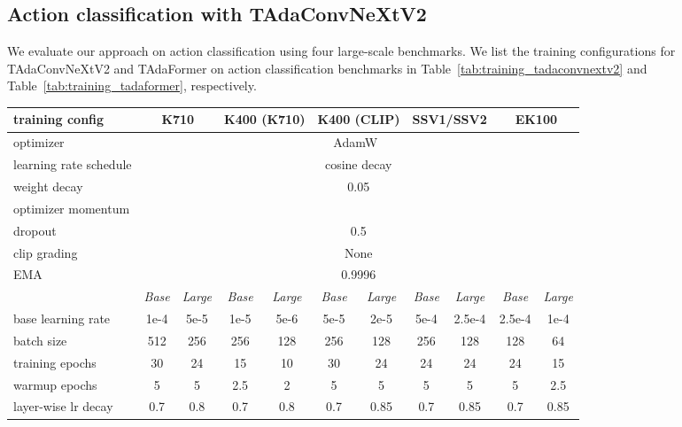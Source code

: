 \documentclass[10pt,journal,compsoc]{IEEEtran}
\newcommand{\tablestyle}[2]{\setlength{\tabcolsep}{#1}\renewcommand{\arraystretch}{#2}\centering\small}
\begin{document}
\subsection{Action classification with TAdaConvNeXtV2}
We evaluate our approach on action classification using four large-scale benchmarks. We list the training configurations for TAdaConvNeXtV2 and TAdaFormer on action classification benchmarks in Table~\ref{tab:training_tadaconvnextv2} and Table~\ref{tab:training_tadaformer}, respectively. 
\begin{table*}[t]
    \centering
    \tablestyle{10pt}{1.0}
    \begin{tabular}{l|cc|cc|cc|cc|cc}
        \toprule
         training config & \multicolumn{2}{c}{K710} & \multicolumn{2}{c}{K400 (K710)} & \multicolumn{2}{c}{K400 (CLIP)} & \multicolumn{2}{c}{SSV1/SSV2} & \multicolumn{2}{c}{EK100} \\
         \midrule
         optimizer& \multicolumn{10}{c}{AdamW~\cite{adamw}} \\
         learning rate schedule & \multicolumn{10}{c}{cosine decay} \\
         weight decay & \multicolumn{10}{c}{0.05} \\
         optimizer momentum & \multicolumn{10}{c}{} \\
         dropout~\cite{dropout} & \multicolumn{10}{c}{0.5} \\
         clip grading & \multicolumn{10}{c}{None} \\
         EMA~\cite{polyak1992ema} & \multicolumn{10}{c}{0.9996} \\
         \midrule
         ~ & \scriptsize\textit{Base} & \scriptsize\textit{Large} & \scriptsize\textit{Base} & \scriptsize\textit{Large} & \scriptsize\textit{Base} & \scriptsize\textit{Large} & \scriptsize\textit{Base} & \scriptsize\textit{Large} & \scriptsize\textit{Base} & \scriptsize\textit{Large}\\
         \cmidrule(lr){2-3} \cmidrule(lr){4-5} \cmidrule(lr){6-7} \cmidrule(lr){8-9} \cmidrule(lr){10-11}
         base learning rate & 1e-4 & 5e-5  & 1e-5  & 5e-6 & 5e-5 & 2e-5 & 5e-4 & 2.5e-4 & 2.5e-4 & 1e-4 \\
         batch size & 512  & 256  & 256  & 128 & 256 & 128 & 256 & 128 & 128 & 64\\
         training epochs & 30  & 24  & 15  & 10 & 30 & 24 & 24 & 24 & 24 & 15\\
         warmup epochs & 5 & 5 & 2.5  & 2 & 5 & 5 & 5 & 5 & 5 & 2.5\\
         layer-wise lr decay~\cite{bao2021beit} & 0.7  & 0.8  & 0.7  & 0.8 & 0.7 & 0.85 & 0.7 & 0.85 & 0.7 & 0.85\\

\end{tabular}
\end{table*}
\end{document}
